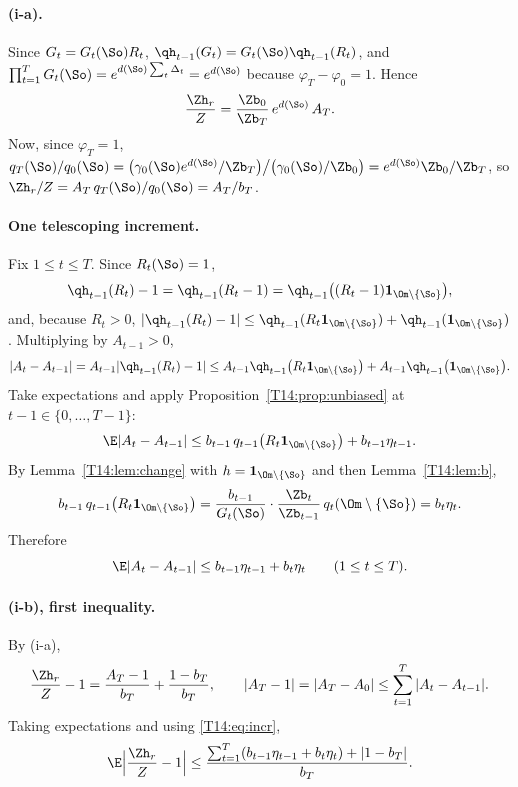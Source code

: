 \documentclass[11pt]{report}
\begin{document}
\paragraph{(i-a).} Since $G_t=G_t(\So)R_t$, $\qh_{t-1}(G_t)=G_t(\So)\qh_{t-1}(R_t)$, and
$\prod_{t=1}^TG_t(\So)=e^{d(\So)\sum_t\Delta_t}=e^{d(\So)}$ because $\varphi_T-\varphi_0=1$. Hence
\[
\frac{\Zh_r}{Z}=\frac{\Zb_0}{\Zb_T}\,e^{d(\So)}\,A_T .
\]
Now, since $\varphi_T=1$, $q_T(\So)/q_0(\So)=\bigl(\gamma_0(\So)e^{d(\So)}/\Zb_T\bigr)\big/\bigl(\gamma_0(\So)/\Zb_0\bigr)
=e^{d(\So)}\Zb_0/\Zb_T$, so $\Zh_r/Z=A_T\,q_T(\So)/q_0(\So)=A_T/b_T$.

\paragraph{One telescoping increment.} Fix $1\le t\le T$. Since $R_t(\So)=1$,
\[
\qh_{t-1}(R_t)-1=\qh_{t-1}(R_t-1)=\qh_{t-1}\bigl((R_t-1)\mathbf 1_{\Om\setminus\{\So\}}\bigr),
\]
and, because $R_t>0$,
$|\qh_{t-1}(R_t)-1|\le\qh_{t-1}(R_t\mathbf 1_{\Om\setminus\{\So\}})+\qh_{t-1}(\mathbf 1_{\Om\setminus\{\So\}})$.
Multiplying by $A_{t-1}>0$,
\[
|A_t-A_{t-1}|=A_{t-1}|\qh_{t-1}(R_t)-1|
\le A_{t-1}\qh_{t-1}\bigl(R_t\mathbf 1_{\Om\setminus\{\So\}}\bigr)+A_{t-1}\qh_{t-1}\bigl(\mathbf 1_{\Om\setminus\{\So\}}\bigr).
\]
Take expectations and apply Proposition~\ref{T14:prop:unbiased} at $t-1\in\{0,\dots,T-1\}$:
\[
\E|A_t-A_{t-1}|\le b_{t-1}\,q_{t-1}\bigl(R_t\mathbf 1_{\Om\setminus\{\So\}}\bigr)+b_{t-1}\eta_{t-1}.
\]
By Lemma~\ref{T14:lem:change} with $h=\mathbf 1_{\Om\setminus\{\So\}}$ and then Lemma~\ref{T14:lem:b},
\[
b_{t-1}\,q_{t-1}\bigl(R_t\mathbf 1_{\Om\setminus\{\So\}}\bigr)
=\frac{b_{t-1}}{G_t(\So)}\cdot\frac{\Zb_t}{\Zb_{t-1}}\,q_t(\Om\setminus\{\So\})=b_t\eta_t .
\]
Therefore
\begin{equation}\label{T14:eq:incr}
\E|A_t-A_{t-1}|\le b_{t-1}\eta_{t-1}+b_t\eta_t\qquad(1\le t\le T).
\end{equation}

\paragraph{(i-b), first inequality.} By (i-a),
\[
\frac{\Zh_r}{Z}-1=\frac{A_T-1}{b_T}+\frac{1-b_T}{b_T},
\qquad |A_T-1|=|A_T-A_0|\le\sum_{t=1}^T|A_t-A_{t-1}| .
\]
Taking expectations and using \eqref{T14:eq:incr},
\[
\E\Bigl|\frac{\Zh_r}{Z}-1\Bigr|\le\frac{\sum_{t=1}^T(b_{t-1}\eta_{t-1}+b_t\eta_t)+|1-b_T|}{b_T}.
\]
\end{document}
